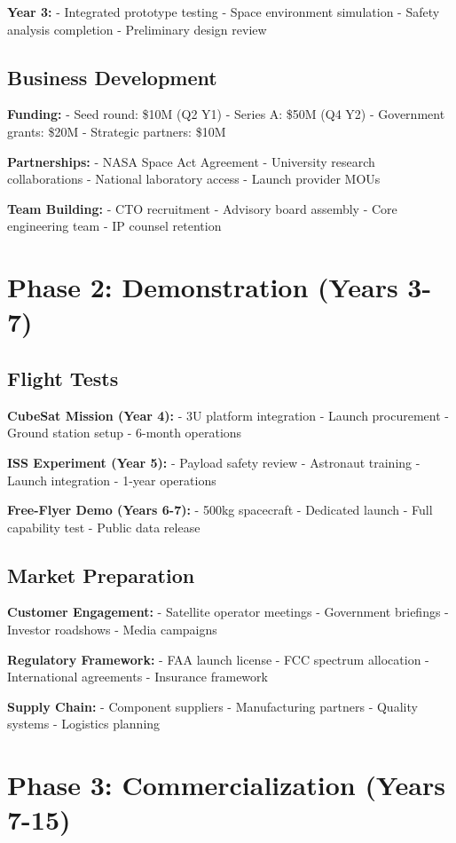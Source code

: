 \documentclass[12pt,letterpaper]{book}
\theoremstyle{definition}
\theoremstyle{plain}
\theoremstyle{remark}
\begin{document}
{{{{{\textbf{Year 3:}
- Integrated prototype testing
- Space environment simulation
- Safety analysis completion
- Preliminary design review

\subsection{Business Development}

\textbf{Funding:}
- Seed round: \$10M (Q2 Y1)
- Series A: \$50M (Q4 Y2)
- Government grants: \$20M
- Strategic partners: \$10M

\textbf{Partnerships:}
- NASA Space Act Agreement
- University research collaborations
- National laboratory access
- Launch provider MOUs

\textbf{Team Building:}
- CTO recruitment
- Advisory board assembly
- Core engineering team
- IP counsel retention

\section{Phase 2: Demonstration (Years 3-7)}

\subsection{Flight Tests}

\textbf{CubeSat Mission (Year 4):}
- 3U platform integration
- Launch procurement
- Ground station setup
- 6-month operations

\textbf{ISS Experiment (Year 5):}
- Payload safety review
- Astronaut training
- Launch integration
- 1-year operations

\textbf{Free-Flyer Demo (Years 6-7):}
- 500kg spacecraft
- Dedicated launch
- Full capability test
- Public data release

\subsection{Market Preparation}

\textbf{Customer Engagement:}
- Satellite operator meetings
- Government briefings
- Investor roadshows
- Media campaigns

\textbf{Regulatory Framework:}
- FAA launch license
- FCC spectrum allocation
- International agreements
- Insurance framework

\textbf{Supply Chain:}
- Component suppliers
- Manufacturing partners
- Quality systems
- Logistics planning

\section{Phase 3: Commercialization (Years 7-15)}

}}}}}
\end{document}
